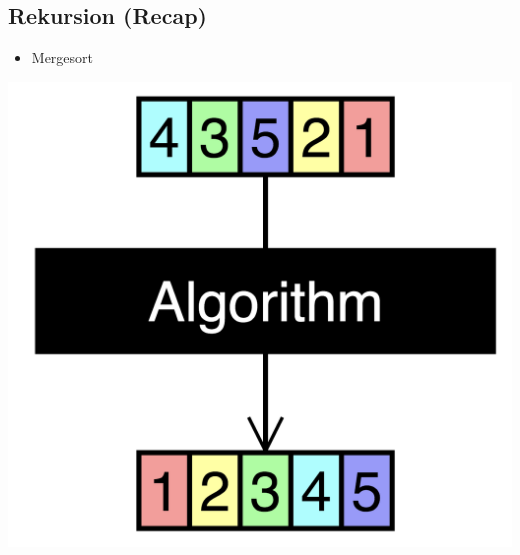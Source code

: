 \documentclass[rgb]{beamer}
\begin{document}
\subsection{Rekursion (Recap)}

\begin{frame}[fragile]




  \begin{minipage}[t]{.7\textwidth}
  \begin{itemize}
  \item Mergesort
  \end{itemize}
  \end{minipage}
  \begin{minipage}{.25\textwidth}
  \includegraphics[width=\textwidth]{../images/sorting_algorithms.png}
  \end{minipage}
\end{frame}
\end{document}
